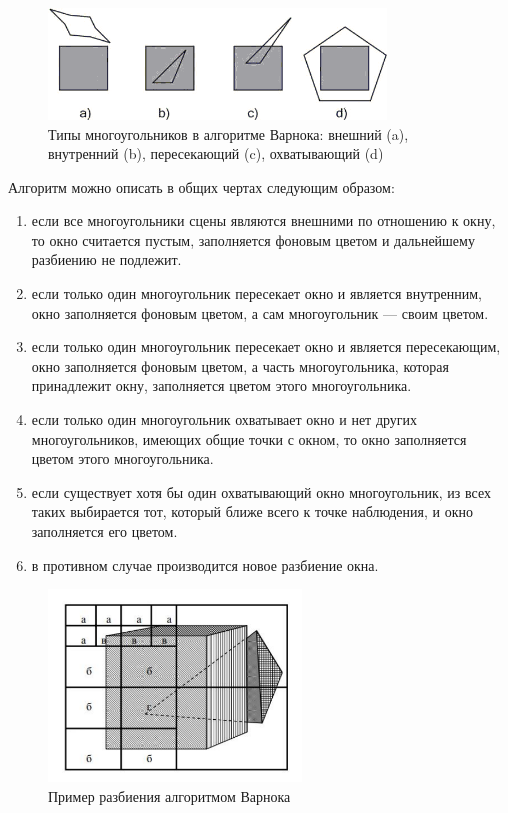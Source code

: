 \begin{figure}[h] 
	\centering
	\includegraphics[width=0.8\textwidth]{images/varnok-models.png}
	\caption{Типы многоугольников в алгоритме Варнока: внешний (a), внутренний (b), пересекающий (c), охватывающий (d)} 
	\label{fig:varnok-models} 
\end{figure}

Алгоритм можно описать в общих чертах следующим образом:
\begin{enumerate}
	\item если все многоугольники сцены являются внешними по отношению к окну, то окно считается пустым, заполняется фоновым цветом и дальнейшему разбиению не подлежит.
	\item если только один многоугольник пересекает окно и является внутренним, окно заполняется фоновым цветом, а сам многоугольник — своим цветом.
	\item если только один многоугольник пересекает окно и является пересекающим, окно заполняется фоновым цветом, а часть многоугольника, которая принадлежит окну, заполняется цветом этого многоугольника.
	\item если только один многоугольник охватывает окно и нет других многоугольников, имеющих общие точки с окном, то окно заполняется цветом этого многоугольника.
	\item если существует хотя бы один охватывающий окно многоугольник, из всех таких выбирается тот, который ближе всего к точке наблюдения, и окно заполняется его цветом.
	\item в противном случае производится новое разбиение окна.
\end{enumerate}

\begin{figure}[h] 
	\centering
	\includegraphics[width=0.6\textwidth]{images/varnok.png}
	\caption{Пример разбиения алгоритмом Варнока} 
	\label{fig:varnok} 
\end{figure}

